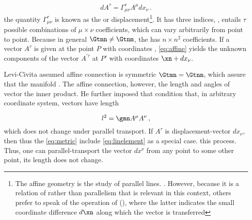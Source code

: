 {\begin{equation}\label{eq:affine}
dA^\tau = \Gamma^\tau_{\mu\nu}A^{\mu} dx_\nu\,.
\end{equation}
%
the  quantity $\Gamma^\tau_{\mu\nu}$ is known as the  or displacement\footnote{The affine geometry is the study of parallel lines. \citet{Weyl1918b}. However, because it is a relation of  rather than parallelism that is relevant in this context, others prefer to speak of the operation of  (), where the latter indicates the small coordinate difference $d\xn$ along which the vector is transferred}. It has three indices, \ie, entails $\tau$ possible combinations of $\mu \times \nu$ coefficients, which can vary arbitrarily from point to point. Because in general $\Gtmn \neq \Gtnm$, the \Gtmn has $n \times n^2$ coefficients. If a vector $A^\tau$ is given at the point $P$ with coordinates \xn, \cref{eq:affine} yields the unknown components of the vector $A^{\prime\tau}$ at $P'$ with coordinates $\xn+dx_\nu$.

Levi-Civita assumed affine connection is symmetric $\Gtmn=\Gtnm$, which assure that the manifold . The affine connection, however, the length and angles of vector the inner product. He further imposed that condition that, in arbitrary coordinate system, vectors have length

\begin{equation*}\label{eq:metric}
l^2 = \gmn A^\mu A^\nu\,,
\end{equation*}
%
which does not change under parallel transport. If $A^\tau$ is displacement-vector $dx_\nu$, then thus the \cref{eq:metric} include \cref{eq:linelement} as a special case. this process. Thus, one can parallel-transport the vector $dx^\nu$ from any point to some other point, its length does not change.





}
